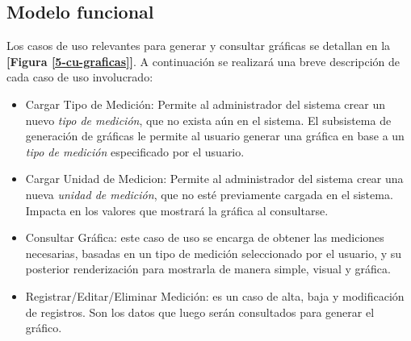 \subsection{Modelo funcional} 

Los casos de uso relevantes para generar y consultar gráficas se detallan en la \textbf{[Figura \ref{5-cu-graficas}]}. A continuación se realizará una breve descripción de cada caso de uso involucrado:

\begin{itemize}
	\item Cargar Tipo de Medición: Permite al administrador del sistema crear un nuevo \textit{tipo de medición}, que no exista aún en el sistema. El subsistema de generación de gráficas le permite al usuario generar una gráfica en base a un \textit{tipo de medición} especificado por el usuario.
	
	\item Cargar Unidad de Medicion: Permite al administrador del sistema crear una nueva \textit{unidad de medición}, que no esté previamente cargada en el sistema. Impacta en los valores que mostrará la gráfica al consultarse.
	
	\item Consultar Gráfica: este caso de uso se encarga de obtener las mediciones necesarias, basadas en un tipo de medición seleccionado por el usuario, y su posterior renderización para mostrarla de manera simple, visual y gráfica.
	
	\item Registrar/Editar/Eliminar Medición: es un caso de alta, baja y modificación de registros. Son los datos que luego serán consultados para generar el gráfico.
	
\end{itemize}

